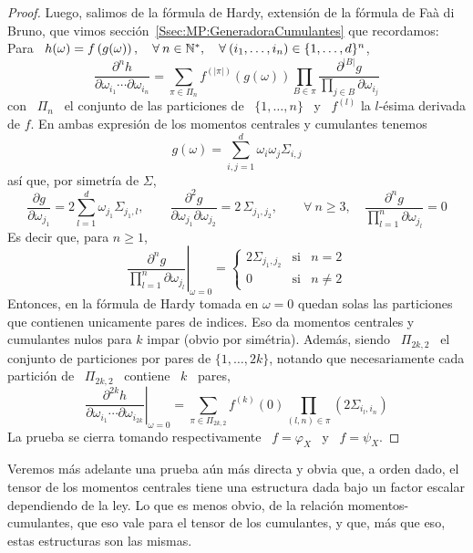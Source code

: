 \begin{proof}
  Luego, salimos de la f\'ormula de  Hardy, extensi\'on de la f\'ormula de Fa\`a
  di   Bruno,   que   vimos   secci\'on~\ref{Ssec:MP:GeneradoraCumulantes}   que
  recordamos: Para \ $h(\omega) =  f\left( g(\omega) \right), \quad \forall \: n
  \in \mathbb{N}^*,  \quad \forall \:  (i_1 , \ldots ,  i_n ) \in  \{ 1 , \ldots  , d
  \}^n$,
  \[
  \frac{\partial^n  h}{\partial  \omega_{i_1}  \cdots \partial  \omega_{i_n}}  =
  \sum_{\pi  \in \Pi_n}  f^{(|\pi|)}\left( g(\omega)  \right) \prod_{B  \in \pi}
  \frac{\partial^{|B|} g}{\displaystyle \prod_{j \in B} \partial \omega_{i_j}}
  \]
  con \ $\Pi_n$ \ el conjunto de las particiones de \ $\{ 1 , \ldots , n \}$ \ y
  \ $f^{(l)}$ la $l$-\'esima derivada de $f$.  En ambas expresi\'on de los momentos
  centrales y cumulantes tenemos
  \[
  g(\omega) = \sum_{i,j=1}^d \omega_i \omega_j \Sigma_{i,j}
  \]
  as\'i que, por simetr\'ia de $\Sigma$,
  \[
  \frac{\partial  g}{\partial   \omega_{j_1}}  =  2   \sum_{l=1}^d  \omega_{j_1}
  \Sigma_{j_1,l},  \qquad  \frac{\partial^2  g}{\partial  \omega_{j_1}  \partial
    \omega_{j_2}}  =  2 \, \Sigma_{j_1,j_2},  \qquad  \forall  \:  n \ge  3,  \quad
  \frac{\partial^n g}{\prod_{l=1}^n \partial \omega_{j_l}} = 0
  \]
  Es decir que, para $n \ge 1$,
  \[
  \left.      \frac{\partial^n    g}{\prod_{l=1}^n     \partial    \omega_{j_l}}
  \right|_{\omega = 0} = \left\{\begin{array}{ccl}
  2   \Sigma_{j_1,j_2} & \mbox{si} & n = 2\\[2mm]
  0 & \mbox{si} & n \ne 2
  \end{array}\right.
  \]
  Entonces,  en la f\'ormula  de Hardy  tomada en  $\omega =  0$ quedan  solas las
  particiones  que  contienen unicamente  pares  de  indices.   Eso da  momentos
  centrales y cumulantes nulos para $k$ impar (obvio por sim\'etria). Adem\'as,
  siendo \  $\Pi_{2 k , 2}$  \ el conjunto de  particiones por pares de  $\{ 1 ,
  \ldots , 2 k \}$, notando que necesariamente cada partici\'on de \ $\Pi_{2 k ,
    2}$ \ contiene \ $k$ \ pares,
  \[
  \left.    \frac{\partial^{2  k}   h}{\partial  \omega_{i_1}   \cdots  \partial
      \omega_{i_{2  k}}}\right|_{\omega =  0} =  \sum_{\pi  \in \Pi_{2  k ,  2}}
  f^{(k)}(0) \prod_{(l,n) \in \pi} \left( 2 \Sigma_{i_l,i_n} \right)
  \]
  La prueba  se cierra  tomando respectivamente  \ $f =  \varphi_X$ \  y \  $f =
  \psi_X$.
\end{proof}
%
Veremos m\'as adelante una prueba a\'un m\'as directa y obvia que, a orden dado,
el tensor  de los momentos  centrales tiene una  estructura dada bajo  un factor
escalar  dependiendo  de la  ley.   Lo  que es  menos  obvio,  de la  relaci\'on
momentos-cumulantes, que eso vale para el tensor de los cumulantes, y que, m\'as
que eso, estas estructuras son las mismas.

